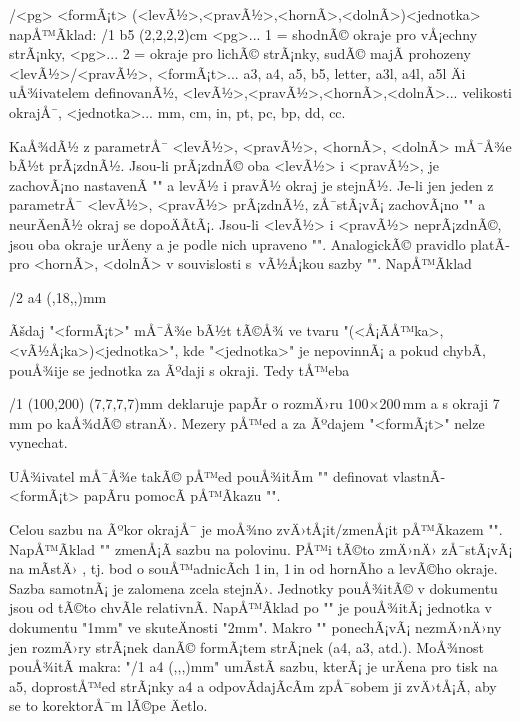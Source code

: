 \begtt 
\margins/<pg> <formÃ¡t> (<levÃ½>,<pravÃ½>,<hornÃ­>,<dolnÃ­>)<jednotka>
napÅ™Ã­klad: 
\margins/1 b5 (2,2,2,2)cm %
<pg>... 1 = shodnÃ© okraje pro vÅ¡echny strÃ¡nky,
<pg>... 2 = okraje pro lichÃ© strÃ¡nky, sudÃ© majÃ­ prohozeny <levÃ½>/<pravÃ½>,
<formÃ¡t>... a3, a4, a5, b5, letter, a3l, a4l, a5l Äi uÅ¾ivatelem definovanÃ½,
<levÃ½>,<pravÃ½>,<hornÃ­>,<dolnÃ­>... velikosti okrajÅ¯,
<jednotka>... mm, cm, in, pt, pc, bp, dd, cc.
\endtt

KaÅ¾dÃ½ z parametrÅ¯ <levÃ½>, <pravÃ½>, <hornÃ­>, <dolnÃ­> mÅ¯Å¾e bÃ½t prÃ¡zdnÃ½.
Jsou-li prÃ¡zdnÃ© oba <levÃ½> i <pravÃ½>, je zachovÃ¡no nastavenÃ­ "\hsize" a
levÃ½ i pravÃ½ okraj je stejnÃ½. Je-li jen jeden z parametrÅ¯
<levÃ½>, <pravÃ½> prÃ¡zdnÃ½, zÅ¯stÃ¡vÃ¡ zachovÃ¡no "\hsize" a neurÄenÃ½ okraj se
dopoÄÃ­tÃ¡. Jsou-li <levÃ½> i <pravÃ½> neprÃ¡zdnÃ©, jsou oba okraje urÄeny 
a je podle nich upraveno "\hsize". 
AnalogickÃ© pravidlo platÃ­ pro <hornÃ­>, <dolnÃ­> v souvislosti 
s~vÃ½Å¡kou sazby "\vsize". NapÅ™Ã­klad

\begtt
\margins/2 a4 (,18,,)mm  %
\endtt

Ãšdaj "<formÃ¡t>" mÅ¯Å¾e bÃ½t tÃ©Å¾ ve tvaru "(<Å¡Ã­Å™ka>,<vÃ½Å¡ka>)<jednotka>", kde
"<jednotka>" je nepovinnÃ¡ a pokud chybÃ­, pouÅ¾ije se jednotka za Ãºdaji s
okraji. Tedy tÅ™eba

\begtt
\margins/1 (100,200) (7,7,7,7)mm
\endtt
%
deklaruje papÃ­r o rozmÄ›ru 100$\times$200\,mm a s okraji 7\,mm po kaÅ¾dÃ©
stranÄ›. Mezery pÅ™ed a za Ãºdajem "<formÃ¡t>" nelze vynechat.

UÅ¾ivatel mÅ¯Å¾e takÃ© pÅ™ed pouÅ¾itÃ­m "\margins" definovat vlastnÃ­ <formÃ¡t> papÃ­ru pomocÃ­
pÅ™Ã­kazu "". 
%

Celou sazbu na Ãºkor okrajÅ¯ je moÅ¾no zvÄ›tÅ¡it/zmenÅ¡it pÅ™Ã­kazem
"\magscale[<factor>]". NapÅ™Ã­klad "\magscale[500]" zmenÅ¡Ã­ sazbu na polovinu.
PÅ™i tÃ©to zmÄ›nÄ› zÅ¯stÃ¡vÃ¡ na mÃ­stÄ› , tj. bod o souÅ™adnicÃ­ch
1\,in, 1\,in od hornÃ­ho a levÃ©ho okraje. Sazba samotnÃ¡ je zalomena zcela
stejnÄ›. Jednotky
pouÅ¾itÃ© v dokumentu jsou od tÃ©to chvÃ­le relativnÃ­. NapÅ™Ã­klad po
"\magscale[2000]" je pouÅ¾itÃ¡ jednotka v dokumentu "1mm" ve skuteÄnosti "2mm".
Makro "\magscale" ponechÃ¡vÃ¡ nezmÄ›nÄ›ny jen rozmÄ›ry strÃ¡nek danÃ© formÃ¡tem
strÃ¡nek (a4, a3, atd.). MoÅ¾nost pouÅ¾itÃ­
makra: "\magscale[1414] \margins/1 a4 (,,,)mm" umÃ­stÃ­ sazbu, kterÃ¡ je urÄena
pro tisk na a5, doprostÅ™ed strÃ¡nky a4 a odpovÃ­dajÃ­cÃ­m zpÅ¯sobem ji zvÄ›tÅ¡Ã­,
aby se to korektorÅ¯m lÃ©pe Äetlo. 


